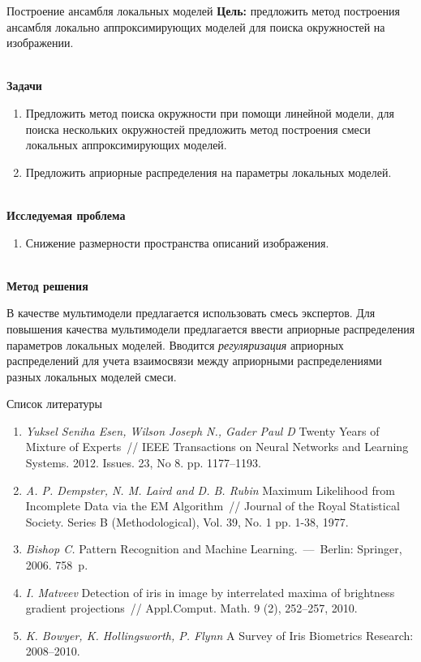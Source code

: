 \documentclass[9pt,pdf,hyperref={unicode}]{beamer}
\begin{document}
\begin{frame}{Построение ансамбля локальных моделей}
\justifying
\textbf{Цель:} предложить метод построения ансамбля локально аппроксимирующих моделей для поиска окружностей на изображении.

~\\
\textbf{Задачи}

\begin{enumerate}
\justifying
	\item Предложить метод поиска окружности при помощи линейной модели, для поиска нескольких окружностей предложить метод построения смеси локальных аппроксимирующих моделей.
	\item Предложить априорные распределения на параметры локальных моделей.
\end{enumerate}

~\\
\textbf{Исследуемая проблема}
\begin{enumerate}
\justifying
	\item Снижение размерности пространства описаний изображения.
\end{enumerate}

~\\
\textbf{Метод решения}

	В качестве мультимодели предлагается использовать смесь экспертов. Для повышения качества мультимодели предлагается ввести априорные распределения параметров локальных моделей. Вводится \textit{регуляризация} априорных распределений для учета взаимосвязи между априорными распределениями разных локальных моделей смеси.
	
\end{frame}
\begin{frame}{Список литературы}
	\begin{enumerate}
	\justifying
		\item \textit{Yuksel Seniha Esen, Wilson Joseph N., Gader Paul D} Twenty Years of Mixture of Experts~// IEEE Transactions on Neural Networks and Learning Systems. 2012. Issues. 23, No 8. pp. 1177--1193.
		\item \textit{A. P. Dempster, N. M. Laird and D. B. Rubin} Maximum Likelihood from Incomplete Data via the EM Algorithm~// Journal of the Royal Statistical Society. Series B (Methodological), Vol. 39, No. 1 pp. 1-38, 1977.
		\item \textit{Bishop C.} Pattern Recognition and Machine Learning.~---~Berlin: Springer, 2006. 758~p.
		\item \textit{I. Matveev} Detection of iris in image by interrelated maxima of brightness gradient projections~// Appl.Comput. Math. 9 (2), 252–257, 2010.
		\item \textit{K. Bowyer, K. Hollingsworth, P. Flynn} A Survey of Iris Biometrics Research: 2008–2010.
		
	\end{enumerate}
\end{frame}
\end{document}
